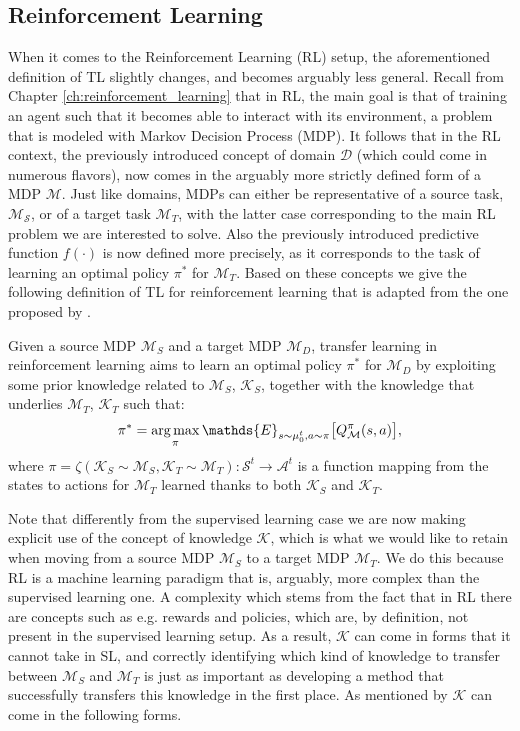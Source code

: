 \subsection{Reinforcement Learning}
\label{sec:reinforcement_learning_tl}
When it comes to the Reinforcement Learning (RL) setup, the aforementioned definition of TL slightly changes, and becomes arguably less general. Recall from Chapter \ref{ch:reinforcement_learning} that in RL, the main goal is that of training an agent such that it becomes able to interact with its environment, a problem that is modeled with Markov Decision Process (MDP). It follows that in the RL context, the previously introduced concept of domain $\mathcal{D}$ (which could come in numerous flavors), now comes in the arguably more strictly defined form of a MDP $\mathcal{M}$. Just like domains, MDPs can either be representative of a source task, $\mathcal{M_S}$, or of a target task $\mathcal{M}_T$, with the latter case corresponding to the main RL problem we are interested to solve. Also the previously introduced predictive function $f(\cdot)$ is now defined more precisely, as it corresponds to the task of learning an optimal policy $\pi^*$ for $\mathcal{M}_T$. Based on these concepts we give the following definition of TL for reinforcement learning that is adapted from the one proposed by \citet{zhu2020transfer}.

\begin{definition}
	Given a source MDP $\mathcal{M}_S$ and a target MDP $\mathcal{M}_D$, transfer learning in reinforcement learning aims to learn an optimal policy $\pi^{*}$ for $\mathcal{M}_D$ by exploiting some prior knowledge related to $\mathcal{M}_S$, $\mathcal{K}_S$, together with the knowledge that underlies $\mathcal{M}_T$, $\mathcal{K}_T$ such that:
	\begin{align}
		\pi^{*} = \argmax_{\pi} \mathds{E}_{s \sim\mu_{0}^{t},a\sim\pi}\bigl[Q^{\pi}_\mathcal{M}(s,a)\bigr],
	\end{align}
	where $\pi = \zeta(\mathcal{K}_S \sim \mathcal{M}_S, \mathcal{K}_T \sim \mathcal{M}_T): \mathcal{S}^t \rightarrow \mathcal{A}^t$ is a function mapping from the states to actions for $\mathcal{M}_T$ learned thanks to both $\mathcal{K}_S$ and $\mathcal{K}_T$.
\end{definition}

Note that differently from the supervised learning case we are now making explicit use of the concept of knowledge $\mathcal{K}$, which is what we would like to retain when moving from a source MDP $\mathcal{M}_S$ to a target MDP $\mathcal{M}_T$. We do this because RL is a machine learning paradigm that is, arguably, more complex than the supervised learning one. A complexity which stems from the fact that in RL there are concepts such as e.g. rewards and policies, which are, by definition, not present in the supervised learning setup. As a result, $\mathcal{K}$ can come in forms that it cannot take in SL, and correctly identifying which kind of knowledge to transfer between $\mathcal{M}_S$ and $\mathcal{M}_T$ is just as important as developing a method that successfully transfers this knowledge in the first place. As mentioned by \citet{lazaric2012transfer} $\mathcal{K}$ can come in the following forms.

